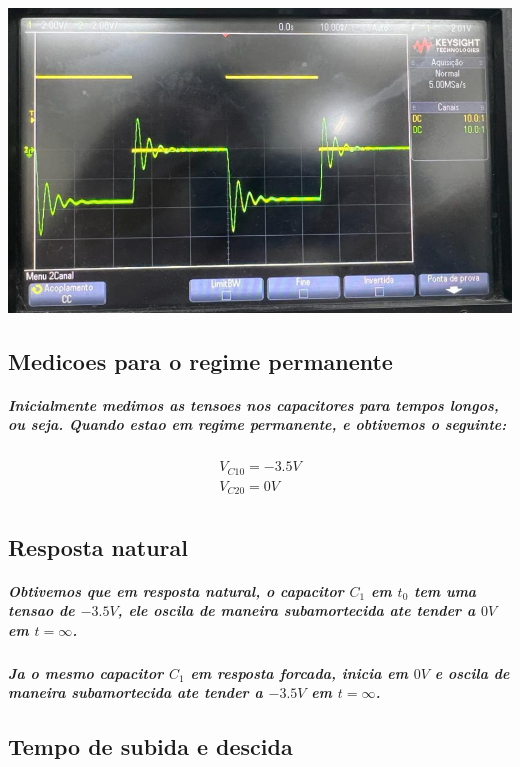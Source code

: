 \documentclass[12pt,twoside, a4paper, twocolumn]{article}
\begin{document}
\begin{adjustbox}{scale=0.4}
    \includegraphics{Figure_1.png}
\end{adjustbox}

\subsection{Medicoes para o regime permanente}

\subparagraph*{Inicialmente medimos as tensoes nos capacitores para tempos longos, ou seja. Quando estao em regime permanente, e obtivemos o seguinte:}

\begin{equation*}
    \begin{aligned}
        V_{C10} = -3.5V \\
        V_{C20} = 0V    \\
    \end{aligned}
\end{equation*}

\subsection{Resposta natural}

\subparagraph*{Obtivemos que em resposta natural, o capacitor $C_1$ em $t_0$ tem uma tensao de $-3.5V$, ele oscila de maneira subamortecida ate tender a $0V$ em $t = \infty$.}

\subparagraph*{Ja o mesmo capacitor $C_1$ em resposta forcada, inicia em $0V$ e oscila de maneira subamortecida ate tender a $-3.5V$ em $t = \infty$.}

\subsection{Tempo de subida e descida}
\end{document}
